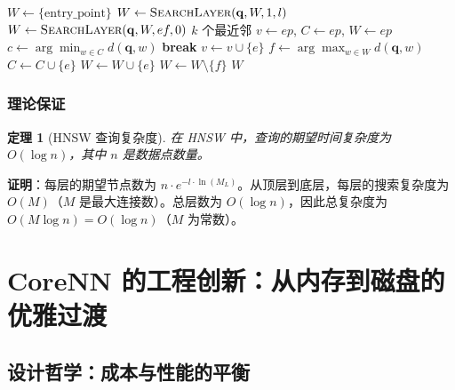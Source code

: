 \documentclass[12pt,a4paper]{article}
\newtheorem{theorem}{定理}[section]
\begin{document}
\begin{algorithm}
\caption{HNSW 搜索算法}
\begin{algorithmic}[1]
    \State $W \gets \{\text{entry\_point}\}$ 
        \State $W \gets \Call{SearchLayer}{\mathbf{q}, W, 1, l}$
    \EndFor
    \State $W \gets \Call{SearchLayer}{\mathbf{q}, W, ef, 0}$
    \State \Return $k$ 个最近邻
\EndProcedure
{}
    \State $v \gets ep$, $C \gets ep$, $W \gets ep$
        \State $c \gets \arg\min_{w \in C} d(\mathbf{q}, w)$
            \State \textbf{break}
        \EndIf
                \State $v \gets v \cup \{e\}$
                \State $f \gets \arg\max_{w \in W} d(\mathbf{q}, w)$
                    \State $C \gets C \cup \{e\}$
                    \State $W \gets W \cup \{e\}$
                        \State $W \gets W \setminus \{f\}$
                    \EndIf
                \EndIf
            \EndIf
        \EndFor
    \EndWhile
    \State \Return $W$
\EndProcedure
\end{algorithmic}
\end{algorithm}

\subsubsection{理论保证}

\begin{theorem}[HNSW 查询复杂度]
在 HNSW 中，查询的期望时间复杂度为 $O(\log n)$，其中 $n$ 是数据点数量。
\end{theorem}

\textbf{证明}：每层的期望节点数为 $n \cdot e^{-l \cdot \ln(M_L)}$。从顶层到底层，每层的搜索复杂度为 $O(M)$（$M$ 是最大连接数）。总层数为 $O(\log n)$，因此总复杂度为 $O(M \log n) = O(\log n)$（$M$ 为常数）。

\section{CoreNN 的工程创新：从内存到磁盘的优雅过渡}

\subsection{设计哲学：成本与性能的平衡}
\end{document}
